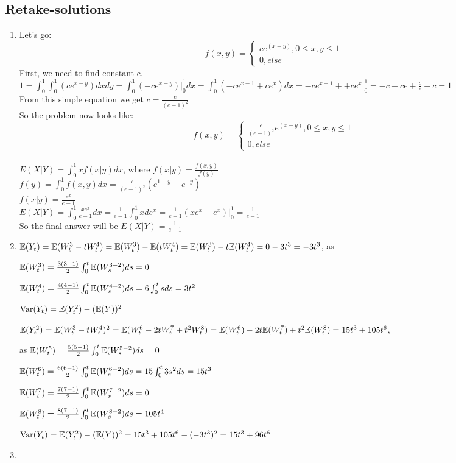 \documentclass[pdftex,12pt,a4paper]{article}
\begin{document}
\subsection{Retake-solutions}
\begin{enumerate}
\item Let's go:
\begin{equation*}
f(x,y)=
   \begin{cases}
   ce^{(x-y)}, 0 \leqslant x,y \leqslant 1\\
   0, else
      \end{cases}
\end{equation*}
First, we need to find constant c.\\
$ 1=\int_{0}^{1} \int_{0}^{1} (ce^{x-y})dxdy=\int_{0}^{1}(-ce^{x-y})\bigg|_0^1dx=\int_{0}^{1}(-ce^{x-1}+ce^x)dx=-ce^{x-1}++ce^x\bigg|_0^1=-c+ce+\frac{c}{e}-c=1$\\
From this simple equation we get $c=\frac{e}{(e-1)^2}$\\
So the problem now looks like:
\begin{equation*}
f(x,y)=
   \begin{cases}
   \frac{e}{(e-1)^2}e^{(x-y)}, 0 \leqslant x,y \leqslant 1\\
   0, else
      \end{cases}
\end{equation*}\\
$E(X|Y)=\int_{0}^{1}xf(x|y)dx$, where $f(x|y)=\frac{f(x,y)}{f(y)}$\\
$f(y)=\int_{0}^{1}f(x,y)dx=\frac{e}{(e-1)^2}(e^{1-y}-e^{-y})$\\
$f(x|y)=\frac{e^x}{e-1}$\\
$E(X|Y)=\int_{0}^{1}\frac{xe^x}{e-1}dx=\frac{1}{e-1}\int_{0}^{1}xde^x=\frac{1}{e-1}(xe^x-e^x)\bigg|_0^1=\frac{1}{e-1}$\\
So the final answer will be $E(X|Y)=\frac{1}{e-1}$

\item $\mathbb{E}(Y_t)=\mathbb{E}(W^3_t-tW^4_t) = \mathbb{E}(W^3_t)-\mathbb{E}(tW^4_t) = \mathbb{E}(W^3_t)-t \mathbb{E}(W^4_t)= 0 - 3t^3 = - 3t^3 $, as

$\mathbb{E}(W^{3}_{t})= \frac{3(3-1)}{2} \int_{0}^{t} \mathbb{E} (W^{3-2}_{s}) ds = 0 $

$\mathbb{E}(W^{4}_{t})= \frac{4(4-1)}{2} \int_{0}^{t} \mathbb{E} (W^{4-2}_{s}) ds = 6 \int_{0}^{t} s ds =3 t^2 $

$\operatorname{Var}(Y_t) =\mathbb{E}(Y^2_t)-(\mathbb{E}(Y))^2$

$\mathbb{E}(Y^2_t)=\mathbb{E}(W^3_t-tW^4_t)^2=\mathbb{E}(W^6_t-2tW^7_t+t^2 W^8_t)= \mathbb{E}(W^6_t)-2t\mathbb{E}(W^7_t)+t^2 \mathbb{E}(W^8_t) = 15t^3 + 105t^6$,

as $\mathbb{E}(W^{5}_{t})= \frac{5(5-1)}{2} \int_{0}^{t} \mathbb{E} (W^{5-2}_{s}) ds = 0 $

$\mathbb{E}(W^{6}_{t})= \frac{6(6-1)}{2} \int_{0}^{t} \mathbb{E} (W^{6-2}_{s}) ds = 15 \int_{0}^{t} 3s^2 ds= 15t^3 $

$\mathbb{E}(W^{7}_{t})= \frac{7(7-1)}{2} \int_{0}^{t} \mathbb{E} (W^{7-2}_{s}) ds = 0 $

$\mathbb{E}(W^{8}_{t})= \frac{8(7-1)}{2} \int_{0}^{t} \mathbb{E} (W^{8-2}_{s}) ds = 105t^4 $

$\operatorname{Var}(Y_t) =\mathbb{E}(Y^2_t)-(\mathbb{E}(Y))^2 = 15t^3 + 105t^6 - (-3t^3)^2= 15t^3 + 96 t^6$

\item 
\end{enumerate}
\end{document}
